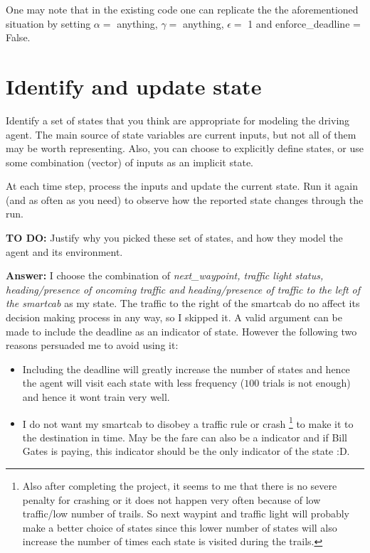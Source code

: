 \documentclass{article}
\begin{document}
One may note that in the existing code one can replicate the the aforementioned situation by setting $\alpha =$ anything, $\gamma =$ anything, $\epsilon =$ 1 and enforce\_deadline = False. 



\section{Identify and update state}

Identify a set of states that you think are appropriate for modeling the driving agent. The main source of state variables are current inputs, but not all of them may be worth representing. Also, you can choose to explicitly define states, or use some combination (vector) of inputs as an implicit state.

At each time step, process the inputs and update the current state. Run it again (and as often as you need) to observe how the reported state changes through the run.

\vspace{.5cm}

\noindent\textbf{TO DO:} Justify why you picked these set of states, and how they model the agent and its environment.

\vspace{.2cm}

\noindent\textbf{Answer:} I choose the combination of \emph{next\_waypoint, traffic light status, heading/presence of oncoming traffic and heading/presence of traffic to the left of the smartcab} as my state. The traffic to the right of the smartcab do no affect its decision making process in any way, so I skipped it. A valid argument can be made to include the deadline as an indicator of state. However the following two reasons persuaded me to avoid using it:
\begin{itemize}
\item Including the deadline will greatly increase the number of states and hence the agent will visit each state with less frequency ($100$ trials is not enough) and hence it wont train very well. 
\item I do not want my smartcab to disobey a traffic rule or crash \footnote{Also after completing the project, it seems to me that there is no severe penalty for crashing or it does not happen very often because of low traffic/low number of trails. So next waypint and traffic light will probably make a better choice of states since this lower number of states will also increase the number of times each state is visited during the trails.} to make it to the destination in time. May be the fare can also be a indicator and if Bill Gates is paying, this indicator should be the only indicator of the state :D. 
\end{itemize} 
\end{document}
